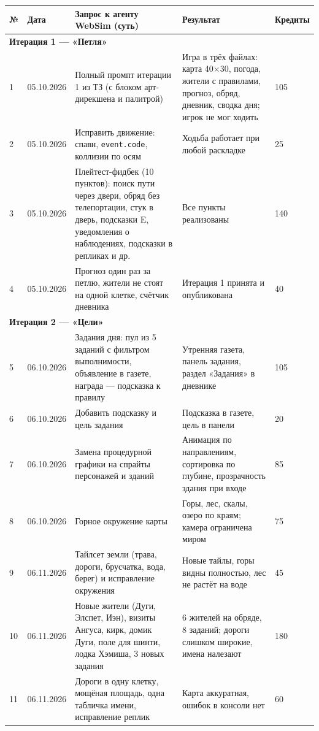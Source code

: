 {\small\setlength{\tabcolsep}{3pt}\renewcommand{\arraystretch}{1.15}
\begin{longtable}{|p{6mm}|p{17mm}|p{62mm}|p{58mm}|p{11mm}|}\hline
№ & Дата & Запрос к агенту WebSim (суть) & Результат & Кре\-диты\\\hline\endhead
\multicolumn{5}{|l|}{\textbf{Итерация 1 — «Петля»}}\\\hline
1 & 05.10.2026 & Полный промпт итерации 1 из ТЗ (с блоком арт-дирекшена и палитрой) & Игра в трёх файлах: карта 40×30, погода, жители с правилами, прогноз, обряд, дневник, сводка дня; игрок не мог ходить & 105\\\hline
2 & 05.10.2026 & Исправить движение: спавн, \texttt{event.code}, коллизии по осям & Ходьба работает при любой раскладке & 25\\\hline
3 & 05.10.2026 & Плейтест-фидбек (10 пунктов): поиск пути через двери, обряд без телепортации, стук в дверь, подсказки E, уведомления о наблюдениях, подсказки в репликах и др. & Все пункты реализованы & 140\\\hline
4 & 05.10.2026 & Прогноз один раз за петлю, жители не стоят на одной клетке, счётчик дневника & Итерация 1 принята и опубликована & 40\\\hline
\multicolumn{5}{|l|}{\textbf{Итерация 2 — «Цели»}}\\\hline
5 & 06.10.2026 & Задания дня: пул из 5 заданий с фильтром выполнимости, объявление в газете, награда — подсказка к правилу & Утренняя газета, панель задания, раздел «Задания» в дневнике & 105\\\hline
6 & 06.10.2026 & Добавить подсказку и цель задания & Подсказка в газете, цель в панели & 20\\\hline
7 & 06.10.2026 & Замена процедурной графики на спрайты персонажей и зданий & Анимация по направлениям, сортировка по глубине, прозрачность здания при входе & 85\\\hline
8 & 06.10.2026 & Горное окружение карты & Горы, лес, скалы, озеро по краям; камера ограничена миром & 75\\\hline
9 & 06.11.2026 & Тайлсет земли (трава, дороги, брусчатка, вода, берег) и исправление окружения & Новые тайлы, горы видны полностью, лес не растёт на воде & 45\\\hline
10 & 06.11.2026 & Новые жители (Дуги, Элспет, Иэн), визиты Ангуса, кирк, домик Дуги, поле для шинти, лодка Хэмиша, 3 новых задания & 6 жителей на обряде, 8 заданий; дороги слишком широкие, имена налезают & 180\\\hline
11 & 06.11.2026 & Дороги в одну клетку, мощёная площадь, одна табличка имени, исправление реплик & Карта аккуратная, ошибок в консоли нет & 60\\\hline

\end{longtable}}
